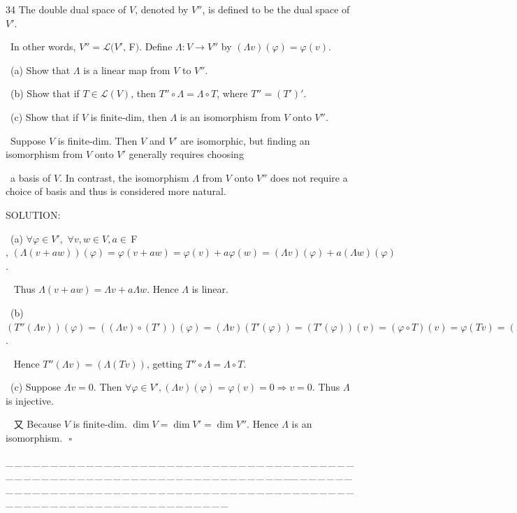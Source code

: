 \documentclass[a4paper, 11pt, UTF8]{article}
\def\Lm{\mathcal{L}}
\def\Fbfc{$\,{\timesbf F}$}
\begin{document}
\begin{large}
{\timesbf\Large 34} {\timessl\Large The double dual space of $V$, denoted by $V''$, is defined to be the dual space
of $V'$.}\par\quad\,
{\timessl\Large In other words, $V''=\Lm(V',\Fbfc)$. Define $\Lambda:V\rightarrow V''$ by $(\Lambda v)(\varphi) = \varphi(v)$.}\par\quad\,
(a) {\timessl\Large Show that $\Lambda$ is a linear map from $V$ to $V''$.}\par\quad\,
(b) {\timessl\Large Show that if $T\in\Lm(V)$, then $T''\circ\Lambda=\Lambda\circ T$, where $T''=(T')'$.}\par\quad\,
(c) {\timessl\Large Show that if $V$ is finite-dim, then $\Lambda$ is an isomorphism from $V$ onto $V''$.}\par\quad\,
{\timessl\small Suppose $V$ is finite-dim. Then $V$ and $V'$ are isomorphic, but finding an isomorphism from $V$ onto $V'$ generally requires choosing}\par\quad\,
{\timessl\small a basis of $V$. In contrast, the isomorphism $\Lambda$ from $V$ onto $V''$ does not require a choice of basis and thus is considered more natural.}\par
{\timesbf S\footnotesize{OLUTION:}}\par\quad\,
(a) $\forall\varphi\in V',\,\,\forall v,w\in V,a\in\Fbfc,\,(\Lambda(v+a w))(\varphi)=\varphi(v+aw)=\varphi(v)+a\varphi(w)=(\Lambda v)(\varphi)+a(\Lambda w)(\varphi)$.\par\qquad\,\,\,
Thus $\Lambda(v+aw)=\Lambda v+a\Lambda w$. Hence $\Lambda$ is linear.\par\quad\,
(b) $(T''(\Lambda v))(\varphi)=((\Lambda v)\circ(T'))(\varphi)=(\Lambda v)(T'(\varphi))=(T'(\varphi))(v)=(\varphi\circ T)(v)=\varphi(Tv)=(\Lambda(Tv))(\varphi)$.\par\qquad\,\,\,
Hence $T''(\Lambda v)=(\Lambda(Tv))$, getting $T''\circ\Lambda=\Lambda\circ T$.\par\quad\,
(c) Suppose $\Lambda v=0$. Then $\forall\varphi\in V',(\Lambda v)(\varphi)=\varphi(v)=0\Rightarrow v=0$. Thus $\Lambda$ is injective.\par\qquad\,\,\,
又 Because $V$ is finite-dim. $\dim V=\dim V'=\dim V''$. Hence $\Lambda$ is an isomorphism.$\,\,\,\,\square$\par
{\tiny \_\,\_\,\_\,\_\,\_\,\_\,\_\,\_\,\_\,\_\,\_\,\_\,\_\,\_\,\_\,\_\,\_\,\_\,\_\,\_\,\_\,\_\,\_\,\_\,\_\,\_\,\_\,\_\,\_\,\_\,\_\,\_\,\_\,\_\,\_\,\_\,\_\,\_\,\_\,\_\,\_\,\_\,\_\,\_\,\_\,\_\,\_\,\_\,\_\,\_\,\_\,\_\,\_\,\_\,\_\,\_\,\_\,\_\,\_\,\_\,\_\,\_\,\_\,\_\,\_\,\_\,\_\,\_\,\_\,\_\,\_\_\,\_\,\_\,\_\,\_\,\_\,\_\,\_\,\_\,\_\,\_\,\_\,\_\,\_\,\_\,\_\,\_\,\_\,\_\,\_\,\_\,\_\,\_\,\_\,\_\,\_\,\_\,\_\,\_\,\_\,\_\,\_\,\_\,\_\,\_\,\_\,\_\,\_\,\_\,\_\,\_\,\_\,\_\,\_\,\_\,\_\,\_\,\_\,\_\,\_\,\_\,\_\,\_\,\_\,\_\,\_\,\_\,\_\,\_\,\_\,\_\,\_\,\_\,\_\,\_\,\_\,\_\,\_\,\_\,\_\,\_}\par


\end{large}
\end{document}
